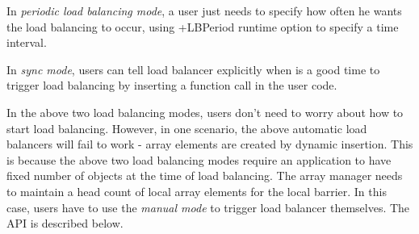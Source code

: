 In {\em periodic load balancing mode}, a user just needs to specify how
often he wants the load balancing to occur, using +LBPeriod runtime
option to specify a time interval. 

In {\em sync mode}, users can tell load balancer explicitly when is a good 
time to trigger load balancing by inserting a function call in the user
code.



In the above two load balancing modes, users don't need 
to worry about how to start load balancing. 
However, in one scenario, the above automatic load balancers will fail to
work - array elements are created by dynamic insertion.
This is because the above two load balancing modes require an application
to have fixed number of objects at the time of load balancing.
The array manager needs to maintain a head count of local array elements
for the local barrier.
In this case, users have to use the {\em manual mode} to trigger 
load balancer themselves. The API is described below.

